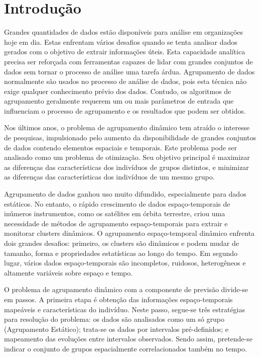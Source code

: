 \chapter{Introdução}
\label{cap:introducao}
Grandes quantidades de dados estão disponíveis para análise em organizações hoje em dia.
Estas enfrentam vários desafios quando se tenta analisar dados gerados com o objetivo de
extrair informações úteis.
Esta capacidade analítica precisa ser reforçada com ferramentas capazes de lidar com
grandes conjuntos de dados sem tornar o processo de análise uma tarefa árdua.
Agrupamento de dados normalmente são usados no processo de análise de dados, pois esta técnica
não exige qualquer conhecimento prévio dos dados. Contudo, os algoritmos de agrupamento
geralmente requerem um ou mais parâmetros de entrada que influenciam o processo de
agrupamento e os resultados que podem ser obtidos. 

Nos últimos anos, o problema de agrupamento dinâmico tem atraído o interesse de pesquisas,
impulsionado pelo aumento da disponibilidade de grandes conjuntos de dados contendo
elementos espaciais e temporais. Este problema pode ser analisado como um problema de
otimização. Seu objetivo principal é maximizar as diferenças das características dos
indivíduos de grupos distintos, e minimizar as diferenças das características dos
indivíduos de um mesmo grupo.


Agrupamento de dados ganhou uso muito difundido, especialmente para dados estáticos.
No entanto, o rápido crescimento de dados espaço-temporais de inúmeros instrumentos,
como os satélites em órbita terrestre, criou uma necessidade de métodos de agrupamento
espaço-temporais para extrair e monitorar clusters dinâmicos. O agrupamento espaço-temporal
dinâmico enfrenta dois grandes desafios: primeiro, os clusters são dinâmicos e podem mudar de
tamanho, forma e propriedades estatísticas ao longo do tempo. Em segundo lugar, vários dados
espaço-temporais são incompletos, ruidosos, heterogêneos e altamente variáveis sobre espaço e tempo.

O problema de agrupamento dinâmico com a componente de previsão divide-se em passos.
A primeira etapa é obtenção das informações espaço-temporais mapeáveis e características do indivíduo.
Neste passo, segue-se três estratégias para resolução do problema: os dados são analisados
como um só grupo (Agrupamento Estático); trata-se os dados por intervalos pré-definidos; e 
mapeamento das evoluções entre intervalos observados. Sendo assim, pretende-se indicar o conjunto
de grupos espacialmente correlacionados também no tempo.

